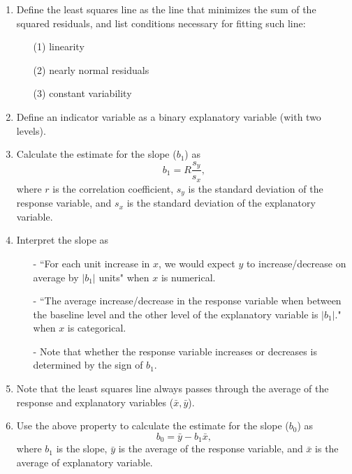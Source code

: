 \documentclass[11pt]{article}
\begin{document}
%

\vspace{0.48cm}

%
\begin{enumerate}[resume]
\renewcommand\labelenumi{\textcolor{light}{\textbf{LO \theenumi.}}}

\item Define the least squares line as the line that minimizes the sum of the squared residuals, and list conditions necessary for fitting such line:
\begin{enumerate}
\item[(1)] linearity
\item[(2)] nearly normal residuals
\item[(3)] constant variability
\end{enumerate}

\item Define an indicator variable as a binary explanatory variable (with two levels).

\item Calculate the estimate for the slope ($b_1$) as 
\[ b_1 = R\frac{s_y}{s_x}, \]
where $r$ is the correlation coefficient, $s_y$ is the standard deviation of the response variable, and $s_x$ is the standard deviation of the explanatory variable.

\item Interpret the slope as 
\begin{itemize}
\item[-] ``For each unit increase in $x$, we would expect $y$ to increase/decrease on average by $|b_1|$ units" when $x$ is numerical.
\item[-] ``The average increase/decrease in the response variable when between the baseline level and the other level of the explanatory variable is $|b_1|$." when $x$ is categorical.
\item[-] Note that whether the response variable increases or decreases is determined by the sign of $b_1$.
\end{itemize}

\item Note that the least squares line always passes through the average of the response and explanatory variables ($\bar{x},\bar{y}$).

\item Use the above property to calculate the estimate for the slope ($b_0$) as 
\[ b_0 = \bar{y} - b_1 \bar{x}, \]
where $b_1$ is the slope, $\bar{y}$ is the average of the response variable, and $\bar{x}$ is the average of explanatory variable.


\end{enumerate}
\end{document}
